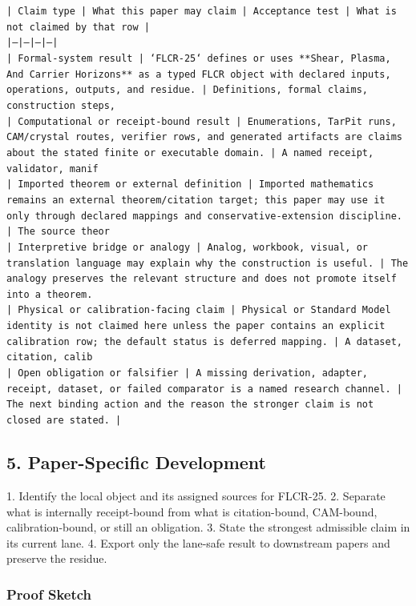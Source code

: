 \documentclass[11pt]{article}
\begin{document}
\noindent\texttt{| Claim type | What this paper may claim | Acceptance test | What is not claimed by that row |}\\
\noindent\texttt{|---|---|---|---|}\\
\noindent\texttt{| Formal-system result | `FLCR-25` defines or uses **Shear, Plasma, And Carrier Horizons** as a typed FLCR object with declared inputs, operations, outputs, and residue. | Definitions, formal claims, construction steps, }\\
\noindent\texttt{| Computational or receipt-bound result | Enumerations, TarPit runs, CAM/crystal routes, verifier rows, and generated artifacts are claims about the stated finite or executable domain. | A named receipt, validator, manif}\\
\noindent\texttt{| Imported theorem or external definition | Imported mathematics remains an external theorem/citation target; this paper may use it only through declared mappings and conservative-extension discipline. | The source theor}\\
\noindent\texttt{| Interpretive bridge or analogy | Analog, workbook, visual, or translation language may explain why the construction is useful. | The analogy preserves the relevant structure and does not promote itself into a theorem. }\\
\noindent\texttt{| Physical or calibration-facing claim | Physical or Standard Model identity is not claimed here unless the paper contains an explicit calibration row; the default status is deferred mapping. | A dataset, citation, calib}\\
\noindent\texttt{| Open obligation or falsifier | A missing derivation, adapter, receipt, dataset, or failed comparator is a named research channel. | The next binding action and the reason the stronger claim is not closed are stated. | }\\

\subsection*{5. Paper-Specific Development}

1. Identify the local object and its assigned sources for FLCR-25.
2. Separate what is internally receipt-bound from what is citation-bound, CAM-bound, calibration-bound, or still an obligation.
3. State the strongest admissible claim in its current lane.
4. Export only the lane-safe result to downstream papers and preserve the residue.

\subsubsection*{Proof Sketch}
\end{document}
